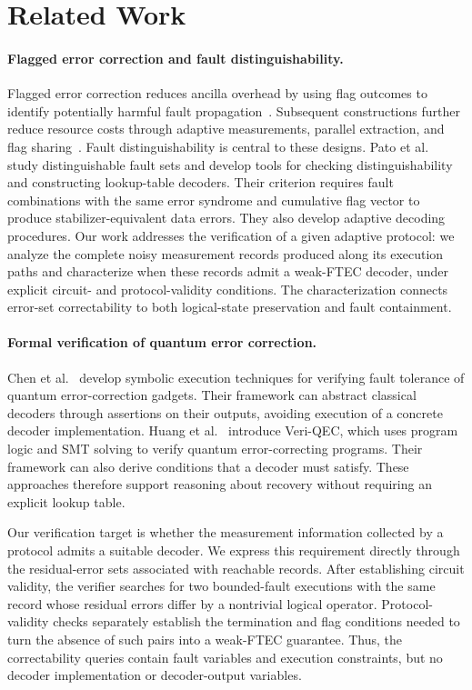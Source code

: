 \documentclass[acmsmall,screen,review,anonymous,nonacm]{acmart}
\begin{document}
\section{Related Work}

\paragraph{Flagged error correction and fault distinguishability.}
Flagged error correction reduces ancilla overhead by using flag outcomes to identify potentially harmful fault propagation~\cite{CR18a,CB18}. Subsequent constructions further reduce resource costs through adaptive measurements, parallel extraction, and flag sharing~\cite{low-depth,Liou25,Du24}. Fault distinguishability is central to these designs. Pato et al.~\cite{PTH+24} study distinguishable fault sets and develop tools for checking distinguishability and constructing lookup-table decoders. Their criterion requires fault combinations with the same error syndrome and cumulative flag vector to produce stabilizer-equivalent data errors. They also develop adaptive decoding procedures. Our work addresses the verification of a given adaptive protocol: we analyze the complete noisy measurement records produced along its execution paths and characterize when these records admit a weak-FTEC decoder, under explicit circuit- and protocol-validity conditions. The characterization connects error-set correctability to both logical-state preservation and fault containment.

\paragraph{Formal verification of quantum error correction.}
Chen et al.~\cite{chen2025verifying} develop symbolic execution techniques for verifying fault tolerance of quantum error-correction gadgets. Their framework can abstract classical decoders through assertions on their outputs, avoiding execution of a concrete decoder implementation. Huang et al.~\cite{10.1145/3729293} introduce Veri-QEC, which uses program logic and SMT solving to verify quantum error-correcting programs. Their framework can also derive conditions that a decoder must satisfy. These approaches therefore support reasoning about recovery without requiring an explicit lookup table.

Our verification target is whether the measurement information collected by a protocol admits a suitable decoder. We express this requirement directly through the residual-error sets associated with reachable records. After establishing circuit validity, the verifier searches for two bounded-fault executions with the same record whose residual errors differ by a nontrivial logical operator. Protocol-validity checks separately establish the termination and flag conditions needed to turn the absence of such pairs into a weak-FTEC guarantee. Thus, the correctability queries contain fault variables and execution constraints, but no decoder implementation or decoder-output variables.
\end{document}
